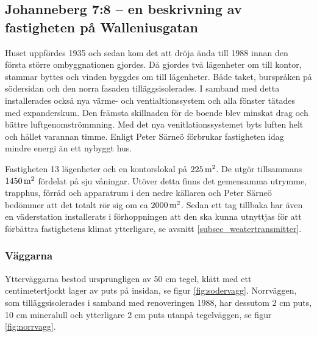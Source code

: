 \subsection{Johanneberg 7:8 – en beskrivning av fastigheten på Walleniusgatan}




Huset uppfördes 1935\cite{ritningar_urspr} och sedan kom det att dröja ända till 1988 innan den första större ombyggnationen gjordes. Då gjordes två lägenheter om till kontor, stammar byttes och vinden byggdes om till lägenheter. Både taket, burspråken på södersidan och den norra fasaden tilläggsisolerades. I samband med detta installerades också nya värme- och ventialtionssystem och alla fönster tätades med expanderskum. Den främsta skillnaden för de boende blev minskat drag och bättre luftgenomströmmning.  Med det nya venitlationssystemet byts luften helt och hållet varannan timme. Enligt Peter Särneö\cite{petersarneo} förbrukar fastigheten idag mindre energi än ett nybyggt hus.

Fastigheten 13 lägenheter och en kontorslokal på $\unit[225]{m^2}$. De utgör tillsammans $\unit[1450]{m^2}$ fördelat på sju våningar. Utöver detta finns det gemensamma utrymme, trapphus, förråd och apparatrum i den nedre källaren och Peter Särneö\cite{petersarneo} bedömmer att det totalt rör sig om ca $\unit[2000]{m^2}$. Sedan ett tag tillbaka har även en väderstation installerats i förhoppningen att den ska kunna utnyttjas för att förbättra fastighetens klimat ytterligare, se avsnitt \ref{subsec_weatertransmitter}.


\subsubsection{Väggarna}

Ytterväggarna bestod ursprungligen av 50 cm tegel, klätt med ett centimetertjockt lager av puts på insidan, se figur \ref{fig:sodervagg}. Norrväggen, som tilläggsisolerades i samband med renoveringen 1988, har dessutom 2 cm puts, 10 cm mineralull och ytterligare 2 cm puts utanpå tegelväggen, se figur \ref{fig:norrvagg}.\cite{kandidatarbete2010}\cite{petersarneo}

